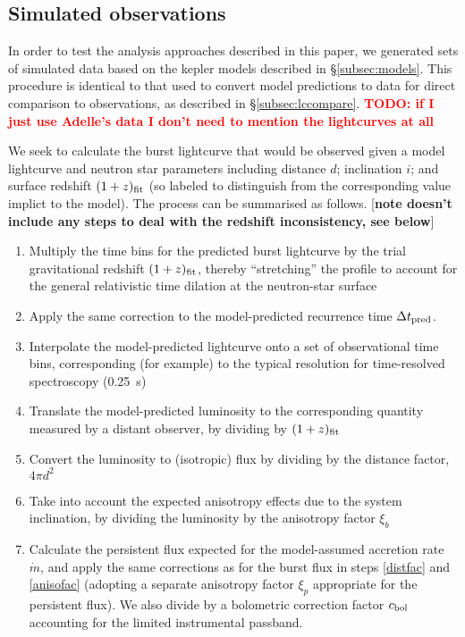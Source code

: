\documentclass{aastex63}
\newcommand{\todo}[1]{\textbf{\textcolor{red}{TODO: #1}}} %
\begin{document}
\subsection{Simulated observations}
\label{subsec:simobs}

In order to test the analysis approaches described in this paper, we generated sets of simulated data based on the {\sc kepler} models described in \S\ref{subsec:models}. 
%
This procedure is identical to that used to convert model predictions to data for direct comparison to observations, as described in \S\ref{subsec:lccompare}.
%
\todo{if I just use Adelle's data I don't need to mention the lightcurves at all}

We seek to calculate the burst lightcurve that would be observed given a model lightcurve and neutron star parameters including distance $d$; inclination $i$; and surface redshift $(1+z)_{\rm fit}$ (so labeled to distinguish from the corresponding value implict to the model). The process can be summarised as follows. [{\bf note doesn't include any steps to deal with the redshift inconsistency, see below}]
\begin{enumerate}
\item Multiply the time bins for the predicted burst lightcurve by the trial gravitational redshift $(1+z)_{\rm fit}$, thereby ``stretching'' the profile to account for the general relativistic time dilation at the neutron-star surface
\item Apply the same correction to the model-predicted recurrence time $\Delta t_{\rm pred}$.
\item Interpolate the model-predicted lightcurve onto a set of observational time bins, corresponding (for example) to the typical resolution for time-resolved spectroscopy (0.25~s)
\item Translate the model-predicted luminosity to the corresponding quantity measured by a distant observer, by 
dividing by $(1+z)_{\rm fit}$
\item Convert the luminosity to (isotropic) flux by dividing by the distance factor, $4\pi d^2$ \label{distfac}
\item Take into account the expected anisotropy effects due to the system inclination, by dividing the luminosity by the anisotropy factor $\xi_b$ \label{anisofac}
\item Calculate the persistent flux expected for the model-assumed accretion rate $\dot{m}$, and apply the same corrections as for the burst flux in steps \ref{distfac} and \ref{anisofac} (adopting a separate anisotropy factor $\xi_p$ appropriate for the persistent flux). We also divide by a bolometric correction factor $c_{\rm bol}$ accounting for the limited instrumental passband.
\end{enumerate}
\end{document}
